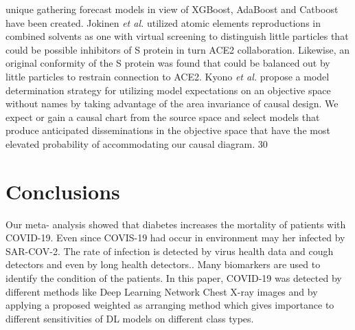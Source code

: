 unique gathering forecast models in view of XGBoost, AdaBoost and Catboost have been created. 
Jokinen \emph{et al.} \cite {jokinen2021detection} utilized atomic elements reproductions in combined solvents as 
one with virtual screening to distinguish little particles that could be possible inhibitors of S protein in turn ACE2 
collaboration. Likewise, an original conformity of the S protein was found that could be balanced out by little 
particles to restrain connection to ACE2. 
Kyono \emph{et al.} \cite {kyono2021exploiting} propose a model determination strategy for utilizing model 
expectations on an objective space without names by taking advantage of the area invariance of causal design. We 
expect or gain a causal chart from the source space and select models that produce anticipated disseminations in the 
objective space that have the most elevated probability of accommodating our causal diagram. 30 
\section{Conclusions} 
Our meta- analysis showed that diabetes increases the mortality of patients with COVID-19. Even since COVIS-19 
had occur in environment may her infected by SAR-COV-2. The rate of infection is detected by virus health data and 
cough detectors and even by long health detectors.. Many biomarkers are used to identify the condition of the 
patients. In this paper, COVID-19 was detected by different methods like Deep Learning Network Chest X-ray 
images and by applying a proposed weighted as arranging method which gives importance to different sensitivities 
of DL models on different class types. 
 
 

